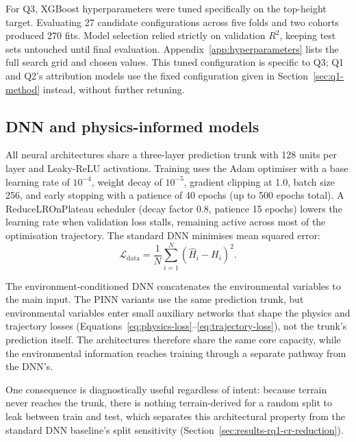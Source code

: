 For Q3, XGBoost hyperparameters were tuned specifically on the top-height target. Evaluating 27 candidate configurations across five folds and two cohorts produced 270 fits. Model selection relied strictly on validation $R^2$, keeping test sets untouched until final evaluation. Appendix~\ref{app:hyperparameters} lists the full search grid and chosen values. This tuned configuration is specific to Q3; Q1 and Q2's attribution models use the fixed configuration given in Section~\ref{sec:q1-method} instead, without further retuning.

\subsection{DNN and physics-informed models}
All neural architectures share a three-layer prediction trunk with 128 units per layer and Leaky-ReLU activations. Training uses the Adam optimiser with a base learning rate of $10^{-4}$, weight decay of $10^{-5}$, gradient clipping at 1.0, batch size 256, and early stopping with a patience of 40 epochs (up to 500 epochs total). A ReduceLROnPlateau scheduler (decay factor 0.8, patience 15 epochs) lowers the learning rate when validation loss stalls, remaining active across most of the optimisation trajectory. The standard DNN minimises mean squared error:
\begin{equation}
\mathcal{L}_{\mathrm{data}}=\frac{1}{N}\sum_{i=1}^{N}
\left(\hat H_i-H_i\right)^2.
\label{eq:data-loss}
\end{equation}

The environment-conditioned DNN concatenates the environmental variables to the main input. The PINN variants use the same prediction trunk, but environmental variables enter small auxiliary networks that shape the physics and trajectory losses (Equations~\ref{eq:physics-loss}--\ref{eq:trajectory-loss}), not the trunk's prediction itself. The architectures therefore share the same core capacity, while the environmental information reaches training through a separate pathway from the DNN's.

 One consequence is diagnostically useful regardless of intent: because terrain never reaches the trunk, there is nothing terrain-derived for a random split to leak between train and test, which separates this architectural property from the standard DNN baseline's split sensitivity (Section~\ref{sec:results-rq1-cr-reduction}).

